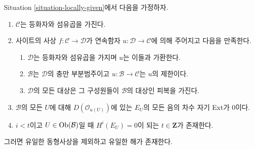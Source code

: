 \begin{lemma}
\label{lemma-bbd-glueing}
Situation \ref{situation-locally-given}에서 다음을 가정하자.
\begin{enumerate}
\item $\mathcal{C}$는 등화자와 섬유곱을 가진다.
\item 사이트의 사상 $f : \mathcal{C} \to \mathcal{D}$가 연속함자
$u : \mathcal{D} \to \mathcal{C}$에 의해 주어지고 다음을 만족한다.
\begin{enumerate}
\item $\mathcal{D}$는 등화자와 섬유곱을 가지며 $u$는 이들과 가환한다.
\item $\mathcal{B}$는 $\mathcal{D}$의 충만 부분범주이고
$u : \mathcal{B} \to \mathcal{C}$는 $u$의 제한이다.
\item $\mathcal{D}$의 모든 대상은 그 구성원들이 $\mathcal{B}$의 대상인
피복을 가진다.
\end{enumerate}
\item $\mathcal{B}$의 모든 $U$에 대해 $D(\mathcal{O}_{u(U)})$에 있는
$E_U$의 모든 음의 차수 자기 Ext가 0이다.
\item $i < t$이고 $U \in \mathop{\mathrm{Ob}}\nolimits(\mathcal{B})$일 때
$H^i(E_U) = 0$이 되는 $t \in \mathbf{Z}$가 존재한다.
\end{enumerate}
그러면 유일한 동형사상을 제외하고 유일한 해가 존재한다.
\end{lemma}

